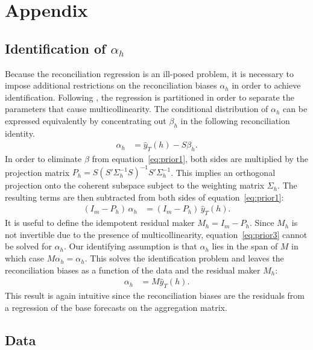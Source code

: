 \appendix
\section{Appendix}
\def\thepage{A\arabic{page}}

\subsection{Identification of $\alpha_h$}
\label{sec:proofs}
Because the reconciliation regression is an ill-posed problem, it is necessary to impose additional restrictions on the reconciliation biases $\alpha_h$ in order to achieve identification. Following \cite{Farebrother1978}, the regression is partitioned in order to separate the parameters that cause multicollinearity. The conditional distribution of $\alpha_h$ can be expressed equivalently by concentrating out $\beta_h$ in the following reconciliation identity.
\begin{align}
	\label{eq:prior1}
	\alpha_h &= \hat{y}_{T}(h) - S\beta_h.
\end{align}
In order to eliminate $\beta$ from equation~\eqref{eq:prior1}, both sides are multiplied by the projection matrix $P_h = S(S'\Sigma_h^{-1} S)^{-1}S'\Sigma_h^{-1}$. This implies an orthogonal projection onto the coherent subspace subject to the weighting matrix $\Sigma_h$. The resulting terms are then subtracted from both sides of equation~\eqref{eq:prior1}:
\begin{align}
	\label{eq:prior3}
	(I_m - P_h)\, \alpha_h &= (I_m - P_h)\, \hat{y}_{T}(h).
\end{align}
It is useful to define the idempotent residual maker $M_h = I_m - P_h$. Since $M_h$ is not invertible due to the presence of multicollinearity, equation~\eqref{eq:prior3} cannot be solved for $\alpha_h$. Our identifying assumption is that $\alpha_h$ lies in the span of $M$ in which case $M\alpha_h = \alpha_h$. This solves the identification problem and leaves the reconciliation biases as a function of the data and the residual maker $M_h$:
\begin{align}
	\alpha_h &= M \hat{y}_{T}(h).
\end{align}
This result is again intuitive since the reconciliation biases are the residuals from a regression of the base forecasts on the aggregation matrix.

\subsection{Data}\label{sec:data}

